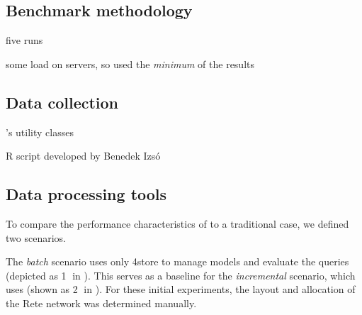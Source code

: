 \subsection{Benchmark methodology}

five runs

some load on servers, so used the \emph{minimum} of the results

\subsection{Data collection}

\tb{}'s utility classes

R script developed by Benedek Izsó \cite{RProject}

\subsection{Data processing tools}

To compare the performance characteristics of \iqd{} to a traditional case, we defined two scenarios. 

The \textit{batch} scenario uses only 4store to manage models and evaluate the queries (depicted as \textcircled{1} in ). This serves as a baseline for the \textit{incremental} scenario, which uses \iqd{} (shown as \textcircled{2} in ). For these initial experiments, the layout and allocation of the Rete network was determined manually. 
